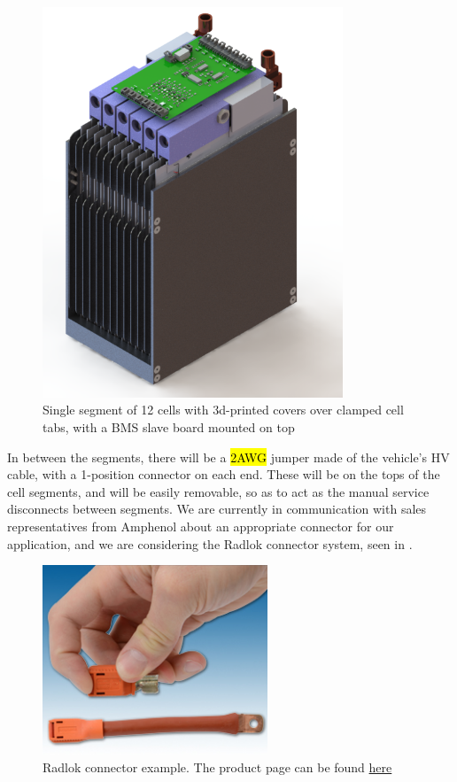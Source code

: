 \documentclass{article}
\begin{document}
\begin{figure}[H]
\centering
\includegraphics[width=0.8\textwidth]{module_2}
\caption{Single segment of 12 cells with 3d-printed covers over clamped cell tabs, with a BMS slave board mounted on top}
\label{fig:cell_tabs}
\end{figure}

In between the segments, there will be a \hl{2AWG} jumper made of the vehicle's HV cable, with a 1-position connector on each end. These will be on the tops of the cell segments, and will be easily removable, so as to act as the manual service disconnects between segments. We are currently in communication with sales representatives from Amphenol about an appropriate connector for our application, and we are considering the Radlok connector system, seen in .

\begin{figure}[H]
\centering
\includegraphics[width=0.6\textwidth]{RADLOK-main.jpg}
\caption{Radlok connector example. The product page can be found \href{http://www.amphenol-industrial.com/radlok}{here}}
\label{fig:radlok}
\end{figure}
\end{document}
